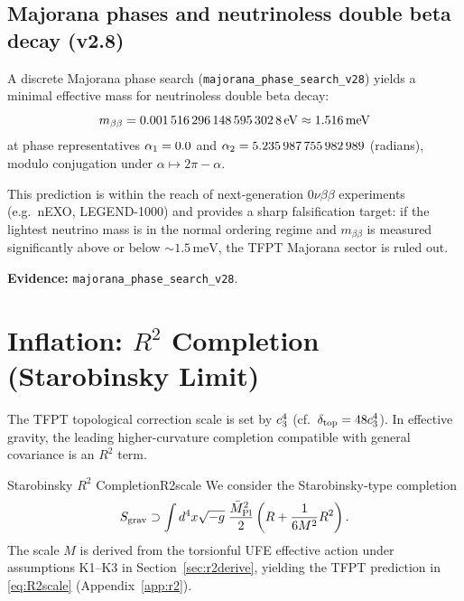 \subsection{Majorana phases and neutrinoless double beta decay (v2.8)}
\label{sec:majorana}

A discrete Majorana phase search (\texttt{majorana\_phase\_search\_v28}) yields a minimal effective mass for neutrinoless double beta decay:
\[
m_{\beta\beta}=\num{0.0015162961485953028}\,\mathrm{eV} \approx 1.516\,\mathrm{meV}
\]
at phase representatives $\alpha_1=\num{0.0}$ and
$\alpha_2=\num{5.235987755982989}$ (radians), modulo conjugation under $\alpha\mapsto 2\pi-\alpha$.

This prediction is within the reach of next-generation $0\nu\beta\beta$ experiments (e.g.\ nEXO, LEGEND-1000) and provides a sharp falsification target: if the lightest neutrino mass is in the normal ordering regime and $m_{\beta\beta}$ is measured significantly above or below $\sim 1.5\,\mathrm{meV}$, the TFPT Majorana sector is ruled out.

\textbf{Evidence:} \texttt{majorana\_phase\_search\_v28}.

\TFPTZthreePermutationMatrix

\TFPTPMNSVariantTable

\section{\texorpdfstring{Inflation: $R^2$ Completion (Starobinsky Limit)}{Inflation: R2 Completion (Starobinsky Limit)}}

The TFPT topological correction scale is set by $c_3^4$ (cf.\ $\delta_{\mathrm{top}} = 48c_3^4$). 
In effective gravity, the leading higher-curvature completion compatible with general covariance is an $R^2$ term.

\begin{definition}{Starobinsky $R^2$ Completion}{R2scale}
We consider the Starobinsky-type completion
\begin{equation}
    S_{\text{grav}} \supset \int d^4x\sqrt{-g}\;\frac{\bar{M}_{\mathrm{Pl}}^2}{2}\left(R + \frac{1}{6M^2}R^2\right).
    \label{eq:R2action}
\end{equation}
The scale $M$ is derived from the torsionful UFE effective action under
assumptions K1--K3 in Section~\ref{sec:r2derive}, yielding the TFPT prediction in
\eqref{eq:R2scale} (Appendix~\ref{app:r2}).
\end{definition}

